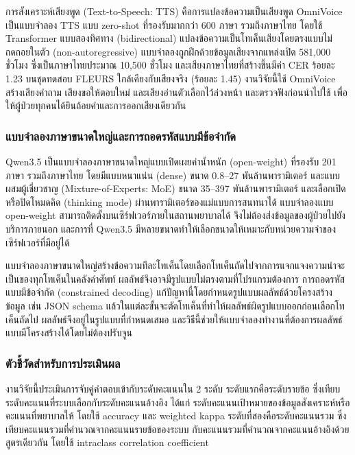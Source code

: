 การสังเคราะห์เสียงพูด (Text-to-Speech: TTS) คือการแปลงข้อความเป็นเสียงพูด
OmniVoice \citep{Zhu2026OmniVoice} เป็นแบบจำลอง TTS แบบ zero-shot ที่รองรับมากกว่า 600 ภาษา รวมถึงภาษาไทย
โดยใช้ Transformer แบบสองทิศทาง (bidirectional) แปลงข้อความเป็นโทเค็นเสียงโดยตรงแบบไม่ถดถอยในตัว (non-autoregressive)
แบบจำลองถูกฝึกด้วยข้อมูลเสียงจากแหล่งเปิด 581,000 ชั่วโมง ซึ่งเป็นภาษาไทยประมาณ 10,500 ชั่วโมง
และเสียงภาษาไทยที่สร้างขึ้นมีค่า CER ร้อยละ 1.23 บนชุดทดสอบ FLEURS ใกล้เคียงกับเสียงจริง (ร้อยละ 1.45) \citep{Zhu2026OmniVoice}
งานวิจัยนี้ใช้ OmniVoice สร้างเสียงคำถาม เสียงขอให้ตอบใหม่ และเสียงอ่านตัวเลือกไว้ล่วงหน้า และตรวจฟังก่อนนำไปใช้
เพื่อให้ผู้ป่วยทุกคนได้ยินถ้อยคำและการออกเสียงเดียวกัน

\subsubsection{แบบจำลองภาษาขนาดใหญ่และการถอดรหัสแบบมีข้อจำกัด}
\label{sec:qwen35}

Qwen3.5 \citep{QwenTeam2026Qwen35} เป็นแบบจำลองภาษาขนาดใหญ่แบบเปิดเผยค่าน้ำหนัก (open-weight) ที่รองรับ 201 ภาษา รวมถึงภาษาไทย
โดยมีแบบหนาแน่น (dense) ขนาด 0.8--27 พันล้านพารามิเตอร์ และแบบผสมผู้เชี่ยวชาญ (Mixture-of-Experts: MoE) ขนาด 35--397 พันล้านพารามิเตอร์
และเลือกเปิดหรือปิดโหมดคิด (thinking mode) ผ่านพารามิเตอร์ของแม่แบบการสนทนาได้ \citep{QwenTeam2026Qwen35Card}
แบบจำลองแบบ open-weight สามารถติดตั้งบนเซิร์ฟเวอร์ภายในสถานพยาบาลได้ จึงไม่ต้องส่งข้อมูลของผู้ป่วยไปยังบริการภายนอก \citep{Wiest2024}
และการที่ Qwen3.5 มีหลายขนาดทำให้เลือกขนาดให้เหมาะกับหน่วยความจำของเซิร์ฟเวอร์ที่มีอยู่ได้

แบบจำลองภาษาขนาดใหญ่สร้างข้อความทีละโทเค็นโดยเลือกโทเค็นถัดไปจากการแจกแจงความน่าจะเป็นของทุกโทเค็นในคลังคำศัพท์
ผลลัพธ์จึงอาจมีรูปแบบไม่ตรงตามที่โปรแกรมต้องการ
การถอดรหัสแบบมีข้อจำกัด (constrained decoding) แก้ปัญหานี้โดยกำหนดรูปแบบผลลัพธ์ด้วยโครงสร้างข้อมูล เช่น JSON schema
แล้วในแต่ละขั้นจะตัดโทเค็นที่ทำให้ผลลัพธ์ผิดรูปแบบออกก่อนเลือกโทเค็นถัดไป
ผลลัพธ์จึงอยู่ในรูปแบบที่กำหนดเสมอ \citep{Willard2023} และวิธีนี้ช่วยให้แบบจำลองทำงานที่ต้องการผลลัพธ์แบบมีโครงสร้างได้โดยไม่ต้องปรับจูน \citep{Geng2023}

\subsubsection{ตัวชี้วัดสำหรับการประเมินผล}
\label{sec:metrics}

งานวิจัยนี้ประเมินการจับคู่คำตอบเข้ากับระดับคะแนนใน 2 ระดับ ระดับแรกคือระดับรายข้อ
ซึ่งเทียบระดับคะแนนที่ระบบเลือกกับระดับคะแนนอ้างอิง ได้แก่ ระดับคะแนนเป้าหมายของข้อมูลสังเคราะห์หรือคะแนนที่พยาบาลให้
โดยใช้ accuracy และ weighted kappa ระดับที่สองคือระดับคะแนนรวม ซึ่งเทียบคะแนนรวมที่คำนวณจากคะแนนรายข้อของระบบ
กับคะแนนรวมที่คำนวณจากคะแนนอ้างอิงด้วยสูตรเดียวกัน โดยใช้ intraclass correlation coefficient


